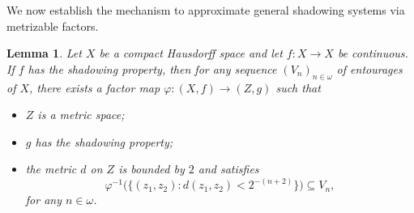 \documentclass[12pt]{amsart}
\newtheorem{lemma}[theorem]{Lemma}
\theoremstyle{definition}
\numberwithin{equation}{section}
\theoremstyle{remark}
\begin{document}
We now establish the mechanism to approximate general shadowing systems via metrizable factors. 

\begin{lemma}\label{keylemma}
Let $X$ be a compact Hausdorff space and let $f: X\to X$ be continuous. 
If $f$ has the shadowing property, then for any sequence $(V_n)_{n\in \omega}$ of entourages of $X$, 
there exists a factor map $\varphi:(X,f)\to (Z,g)$ such that 
\begin{itemize}
\item[(1)] $Z$ is a metric space;
\item[(2)] $g$ has the shadowing property;
\item[(3)] the metric $d$ on $Z$ is bounded by $2$ and satisfies
\begin{equation}\label{eq:factor-control}
\varphi^{-1}\bigl(\{(z_1,z_2): d(z_1,z_2)<{2^{-(n+2)}}\}\bigr)
\subseteq  V_n,
\end{equation}
for any $n\in \omega$.
\end{itemize}
\end{lemma}
\end{document}
